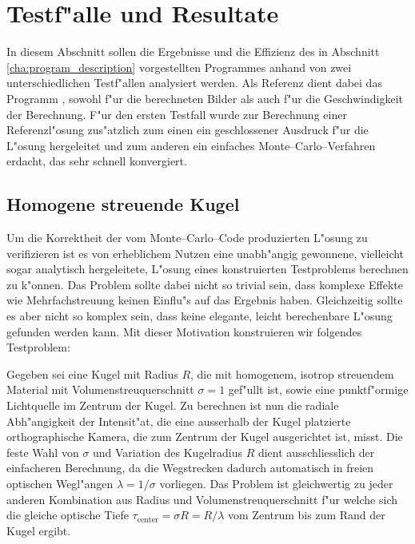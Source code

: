 	\chapter{Testf"alle und Resultate}
	In diesem Abschnitt sollen die Ergebnisse und die Effizienz des in Abschnitt \ref{cha:program_description} vorgestellten Programmes anhand von zwei unterschiedlichen Testf"allen analysiert werden. Als Referenz dient dabei das Programm \mctd \citep{Wolf:2003p12974}, sowohl f"ur die berechneten Bilder als auch f"ur die Geschwindigkeit der Berechnung. F"ur den ersten Testfall wurde zur Berechnung einer Referenzl"osung zus"atzlich zum einen ein geschlossener Ausdruck f"ur die L"osung hergeleitet und zum anderen ein einfaches Monte--Carlo--Verfahren erdacht, das sehr schnell konvergiert.
	
	\section{Homogene streuende Kugel}
	Um die Korrektheit der vom Monte--Carlo--Code produzierten L"osung zu verifizieren ist es von erheblichem Nutzen eine unabh"angig gewonnene, vielleicht sogar analytisch hergeleitete, L"osung eines konstruierten Testproblems berechnen zu k"onnen. Das Problem sollte dabei nicht so trivial sein, dass komplexe Effekte wie Mehrfachstreuung keinen Einflu"s auf das Ergebnis haben. Gleichzeitig sollte es aber nicht so komplex sein, dass keine elegante, leicht berechenbare L"osung gefunden werden kann.
	Mit dieser Motivation konstruieren wir folgendes Testproblem:
		
	Gegeben sei eine Kugel mit Radius $R$, die mit homogenem, isotrop streuendem Material mit Volumenstreuquerschnitt $\sigma=1$ gef"ullt ist, sowie eine punktf"ormige Lichtquelle im Zentrum der Kugel. Zu berechnen ist nun die radiale Abh"angigkeit der Intensit"at, die eine ausserhalb der Kugel platzierte orthographische Kamera, die zum Zentrum der Kugel ausgerichtet ist, misst. Die feste Wahl von $\sigma$ und Variation des Kugelradius $R$ dient ausschliesslich der einfacheren Berechnung, da die Wegstrecken dadurch automatisch in freien optischen  Wegl"angen $\lambda=1/\sigma$ vorliegen. Das Problem ist gleichwertig zu jeder anderen Kombination aus Radius und Volumenstreuquerschnitt f"ur welche sich die gleiche optische Tiefe $\tau_\text{center}=\sigma R=R/\lambda$ vom Zentrum bis zum Rand der Kugel ergibt.
	
